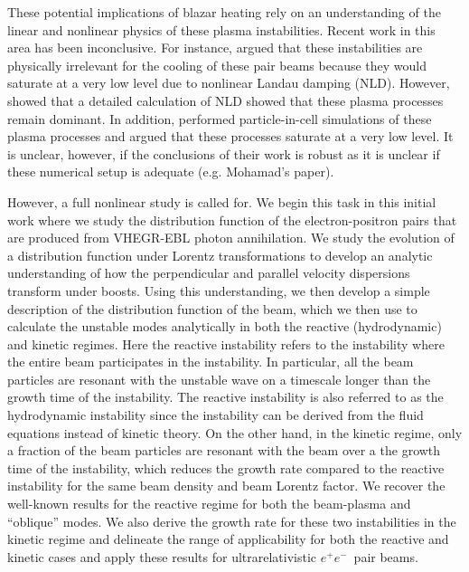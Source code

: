 \documentclass[usenatbib,iop,apj]{emulateapj}
\newcommand{\epm}{\ensuremath{e^+e^-}}
\begin{document}
These potential implications of blazar heating rely on an understanding of the linear and nonlinear physics of these plasma instabilities.  Recent work in this area has been inconclusive.  For instance, \citet{Miniati+12} argued that these instabilities are physically irrelevant for the cooling of these pair beams because they would saturate at a very low level due to nonlinear Landau damping (NLD).  However, \citet{Chang+14} showed that a detailed calculation of NLD showed that these plasma processes remain dominant.  In addition, \citet{Siron+14} performed particle-in-cell simulations of these plasma processes and argued that these processes saturate at a very low level.  It is unclear, however, if the conclusions of their work is robust as it is unclear if these numerical setup is adequate (e.g. Mohamad's paper).  

However, a full nonlinear study is called for.  We begin this task in this initial work where we study the distribution function of the electron-positron pairs that are produced from VHEGR-EBL photon annihilation.  We study the evolution of a distribution function under Lorentz transformations to develop an analytic understanding of how the perpendicular and parallel velocity dispersions transform under boosts.  Using this understanding, we then develop a simple description of the distribution function of the beam, which we then use to calculate the unstable modes analytically in both the reactive (hydrodynamic) and kinetic regimes. Here the reactive instability refers to the instability where the entire beam participates in the instability.  In particular, all the beam particles are resonant with the unstable wave on a timescale longer than the growth time of the instability.  The reactive instability is also referred to as the hydrodynamic instability since the instability can be derived from the fluid equations instead of kinetic theory.  On the other hand, in the kinetic regime, only a fraction of the beam particles are resonant with the beam over a the growth time of the instability, which reduces the growth rate compared to the reactive instability for the same beam density and beam Lorentz factor.  We recover the well-known results for the reactive regime for both the beam-plasma and ``oblique'' modes.  We also derive the growth rate for these two instabilities in the kinetic regime and delineate the range of applicability for both the reactive and kinetic cases and apply these results for ultrarelativistic \epm\ pair beams. 
\end{document}
